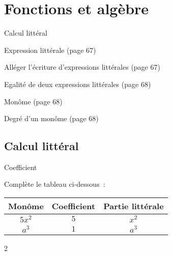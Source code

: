 \documentclass[a4paper,11pt]{report}
\begin{document}
\newcommand{\chapterName}{Fonctions et algèbre}
\newcommand{\serieName}{Calcul littéral}

\chapter*{\chapterName}
\thispagestyle{empty}

\begin{amL}{\serieName}{
\item Expression littérale (page 67)
\item Alléger l'écriture d'expressions littérales (page 67)
\item Egalité de deux expressions littérales (page 68)
\item Monôme (page 68)
\item Degré d'un monôme (page 68)
}
\end{amL}
\section*{\serieName}
\setcounter{page}{1}


\begin{QSJ}{92}{2}
\end{QSJ}

\begin{resolu}{Coefficient}
{ Complète le tableau ci-dessous~:
\begin{center}
\begin{tabular}{|c|c|c|}
 \hline
   Monôme & Coefficient & Partie littérale\\   
\hline
$ 5x^2 $ &    $5$  & $x^2$ \\
 \hline
$a^3$ &$1$&$a^3$ \\
\hline  
\end{tabular}%
\end{center}
}
{2}
\end{resolu}
\end{document}
